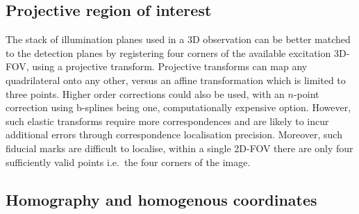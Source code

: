 \subsection{Projective region of interest}

The stack of illumination planes used in a \gls{3D} observation can be better matched to the detection planes by registering four corners of the available excitation \gls{3D}-\gls{FOV}, using a projective transform. %
Projective transforms can map any quadrilateral onto any other, versus an affine transformation which is limited to three points.
Higher order corrections could also be used, with an \(n\)-point correction using b-splines being one, computationally expensive option.
However, such elastic transforms require more correspondences and are likely to incur additional errors through correspondence localisation precision.
Moreover, such fiducial marks are difficult to localise, within a single \gls{2D}-\gls{FOV} there are only four sufficiently valid points i.e.~the four corners of the image.%


\subsection{Homography and homogenous coordinates}

